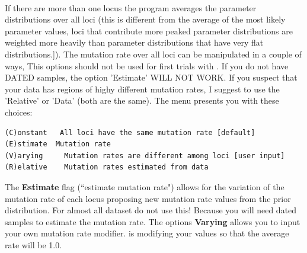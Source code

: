 \begin{description}
\item{}\\
If there are more than one locus the program averages the parameter distributions over all loci (this is different from the average of the most likely parameter values, loci that contribute more peaked parameter distributions are weighted more heavily than parameter distributions that have very flat distributions.]).
The mutation rate over all loci can be manipulated in a couple of ways, This options should not be used for first trials with \migrate. If you do not have DATED samples, the option 'Estimate' WILL NOT WORK. If you suspect that your data has regions of highy different mutation rates, I suggest to use the 'Relative' or 'Data' (both are the same).
The menu presents you with these choices:
\begin{small}
\begin{verbatim}
(C)onstant   All loci have the same mutation rate [default]
(E)stimate  Mutation rate 
(V)arying     Mutation rates are different among loci [user input]
(R)elative    Mutation rates estimated from data
\end{verbatim}
\end{small}
%
%
 The \textbf{Estimate} flag (``estimate mutation rate") allows for the variation 
of the mutation rate of each locus proposing new mutation rate values from the prior distribution.
For almost all dataset do not use this! Because you will need dated samples to estimate the mutation rate. 
The options {\bf Varying} allows you to input your own mutation rate modifier. \migrate is modifying your values so that the average rate will be 1.0.


\end{description}
